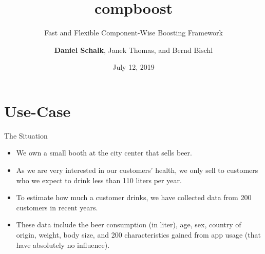 \documentclass[10pt]{beamer}\usepackage[]{graphicx}\usepackage[]{color}
\title{compboost}
\subtitle{Fast and Flexible Component-Wise Boosting Framework}
\date{July 12, 2019}
\author{\textbf{Daniel Schalk}, Janek Thomas, and Bernd Bischl}
\institute{LMU Munich\\Working Group Computational Statistics}
\begin{document}



\maketitle



\section{Use-Case}

\begin{frame}{The Situation}

\begin{itemize}
  \item
    We own a small booth at the city center that sells beer.

  \item
    As we are very interested in our customers' health, we only sell to customers who we expect to drink less than 110 liters per year.

  \item
    To estimate how much a customer drinks, we have collected data from 200 customers in recent years.

  \item
    These data include the beer consumption (in liter), age, sex, country of origin, weight, body size, and 200 characteristics gained from app usage (that have absolutely no influence).
\end{itemize}

\end{frame}
\end{document}
